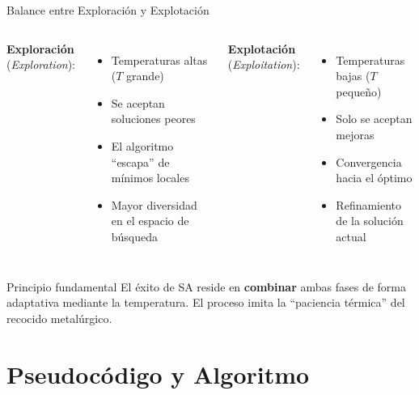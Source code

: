 \documentclass[aspectratio=169,xcolor=dvipsnames]{beamer}
\begin{document}
\begin{frame}{Balance entre Exploración y Explotación}
    \begin{columns}
        \textbf{Exploración} (\textit{Exploration}):
        \begin{itemize}
            \item Temperaturas altas ($T$ grande)
            \item Se aceptan soluciones peores
            \item El algoritmo ``escapa'' de mínimos locales
            \item Mayor diversidad en el espacio de búsqueda
        \end{itemize}
        \textbf{Explotación} (\textit{Exploitation}):
        \begin{itemize}
            \item Temperaturas bajas ($T$ pequeño)
            \item Solo se aceptan mejoras
            \item Convergencia hacia el óptimo
            \item Refinamiento de la solución actual
        \end{itemize}
    \end{columns}
    \vspace{0.4cm}
    \begin{exampleblock}{Principio fundamental}
        El éxito de SA reside en \textbf{combinar} ambas fases de forma adaptativa mediante la temperatura. El proceso imita la ``paciencia térmica'' del recocido metalúrgico.
    \end{exampleblock}
\end{frame}

\section{Pseudocódigo y Algoritmo}
\end{document}
